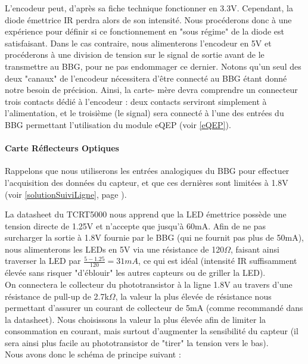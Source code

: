 			L'encodeur peut, d'après sa fiche technique \cite{bib9} fonctionner en 3.3V. Cependant, la diode émettrice IR perdra alors de son intensité. Nous procéderons donc à une expérience pour définir si ce fonctionnement en "sous régime" de la diode est satisfaisant. Dans le cas contraire, nous alimenterons l'encodeur en 5V et procéderons à une division de tension sur le signal de sortie avant de le transmettre au BBG, pour ne pas endommager ce dernier. Notons qu'un seul des deux "canaux" de l'encodeur nécessitera d'être connecté au BBG étant donné notre besoin de précision. Ainsi, la carte- mère devra comprendre un connecteur trois contacts dédié à l'encodeur : deux contacts serviront simplement à l'alimentation, et le troisième (le signal) sera connecté à l'une des entrées du BBG permettant l'utilisation du module eQEP (voir \ref{eQEP}).

		\paragraph{Carte Réflecteurs Optiques}\label{integrationReflecteurs}

			Rappelons que nous utiliserons les entrées analogiques du BBG pour effectuer l'acquisition des données du capteur, et que ces dernières sont limitées à 1.8V (voir \ref{solutionSuiviLigne}, page \pageref{solutionSuiviLigne}).

			La datasheet du TCRT5000 \cite{bib7} nous apprend que la LED émettrice possède une tension directe de 1.25V et n'accepte que jusqu'à 60mA.
			Afin de ne pas surcharger la sortie à 1.8V fournie par le BBG (qui ne fournit pas plus de 50mA), nous alimenterons les LEDs en 5V via une résistance de 120$\Omega$, faisant ainsi traverser la LED par $\frac{5-1.25}{120}=31mA$, ce qui est idéal (intensité IR suffisamment élevée sans risquer "d'éblouir" les autres capteurs ou de griller la LED).\\

			On connectera le collecteur du phototransistor à la ligne 1.8V au travers d'une résistance de pull-up de 2.7k$\Omega$, la valeur la plus élevée de résistance nous permettant d'assurer un courant de collecteur de 5mA (comme recommandé dans la datasheet). Nous choisissons la valeur la plus élevée afin de limiter la consommation en courant, mais surtout d'augmenter la sensibilité du capteur (il sera ainsi plus facile au phototransistor de "tirer" la tension vers le bas).\\

			Nous avons donc le schéma de principe suivant :

